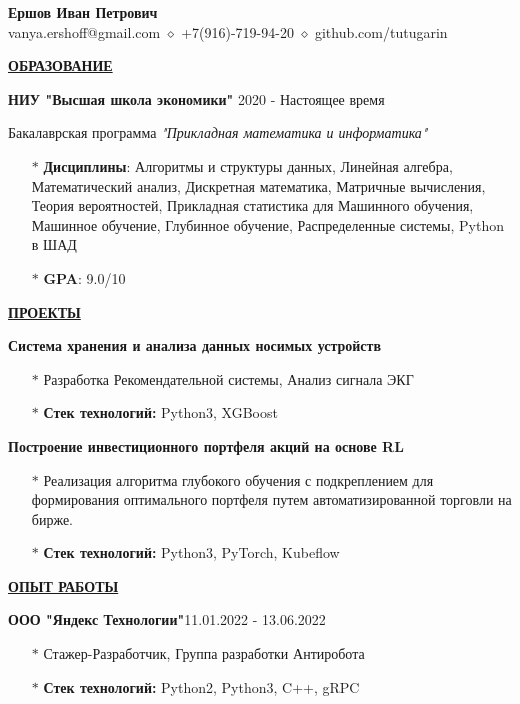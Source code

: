 \documentclass[11pt]{article}
\begin{document}
\begin{center}
\thispagestyle{empty}
\large \textbf{Ершов Иван Петрович \\}    
\normalsize vanya.ershoff@gmail.com $\diamond$ +7(916)-719-94-20 $\diamond$ github.com/tutugarin   \\
\hrulefill
\end{center}

\noindent \textbf{\underline{ОБРАЗОВАНИЕ}} \\
\par \textbf{НИУ "Высшая школа экономики"} \hfill 2020 - Настоящее время
\par Бакалаврская программа \textit{"Прикладная математика и информатика" } 
\begin{itemize}
\item[$\ast$] \textbf{Дисциплины}: Алгоритмы и структуры данных, Линейная алгебра, Математический анализ, Дискретная математика, Матричные вычисления, Теория вероятностей, Прикладная статистика для Машинного обучения, Машинное обучение, Глубинное обучение, Распределенные системы, Python в ШАД

\item[$\ast$] \textbf{GPA}: 9.0/10 \\
\end{itemize}

\noindent \textbf{\underline{ПРОЕКТЫ}} \\
\par \textbf{\large{Система хранения и анализа данных носимых устройств}}
\begin{itemize}
\item[$\ast$] Разработка Рекомендательной системы, Анализ сигнала ЭКГ
\item[$\ast$] \textbf{Стек технологий:} Python3, XGBoost\\
\end{itemize}

\par \textbf{\large{Построение инвестиционного портфеля акций на основе RL}}
\begin{itemize}
\item[$\ast$] Реализация алгоритма глубокого обучения с подкреплением для формирования оптимального портфеля путем автоматизированной торговли на бирже.
\item[$\ast$] \textbf{Стек технологий:} Python3, PyTorch, Kubeflow \\
\end{itemize}

\noindent \textbf{\underline{ОПЫТ РАБОТЫ}} \\
\par \textbf{ООО "Яндекс Технологии"}\hfill 11.01.2022 - 13.06.2022
\begin{itemize}
    \item[$\ast$] Стажер-Разработчик, Группа разработки Антиробота
    \item[$\ast$] \textbf{Стек технологий:} Python2, Python3, C++, gRPC \\
\end{itemize}
\end{document}
